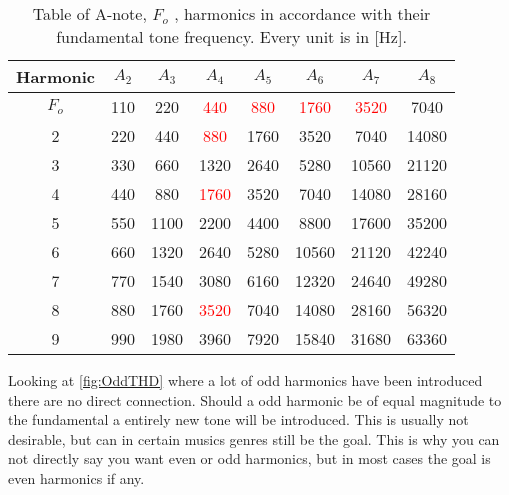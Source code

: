 \begin{table}[H]
\centering
{}
\begin{tabular}{S[table-format=1]ccccccc} \toprule
    {Harmonic} & {$A_2$} & {$A_3$} & {$A_4$} & {$A_5$} & {$A_6$} & {$A_7$} & {$A_8$} \\ \midrule 
    $F_o$  & 110  & 220  & \textcolor{red}{440}   & \textcolor{red}{880}  & \textcolor{red}{1760}  & \textcolor{red}{3520}   & 7040   \\       & 220  & 440  & \textcolor{red}{880}   & 1760 & 3520   & 7040   & 14080  \\ 
    3      & 330  & 660  & 1320  & 2640 & 5280   & 10560  & 21120  \\
    4      & 440  & 880  & \textcolor{red}{1760}  & 3520 & 7040   & 14080  & 28160  \\ 
    5      & 550  & 1100 & 2200  & 4400 & 8800   & 17600  & 35200  \\       & 660  & 1320 & 2640  & 5280 & 10560  & 21120  & 42240  \\
    7      & 770  & 1540 & 3080  & 6160 & 12320  & 24640  & 49280  \\
    8      & 880  & 1760 & \textcolor{red}{3520}  & 7040 & 14080  & 28160  & 56320  \\ 
    9      & 990  & 1980 & 3960  & 7920 & 15840  & 31680  & 63360  \\ \bottomrule
\end{tabular}
\caption{Table of A-note, $F_o$ , harmonics in accordance with their fundamental tone frequency. Every unit is in [Hz].\citep{sou:NoteA}}
\label{tab:NoteA4}
\end{table}

Looking at \autoref{fig:OddTHD} where a lot of odd harmonics have been introduced there are no direct connection. Should a odd harmonic be of equal magnitude to the fundamental a entirely  new tone will be introduced. This is usually not desirable, but can in certain musics genres still be the goal. This is why you can not directly say you want even or odd harmonics, but in most cases the goal is even harmonics if any.